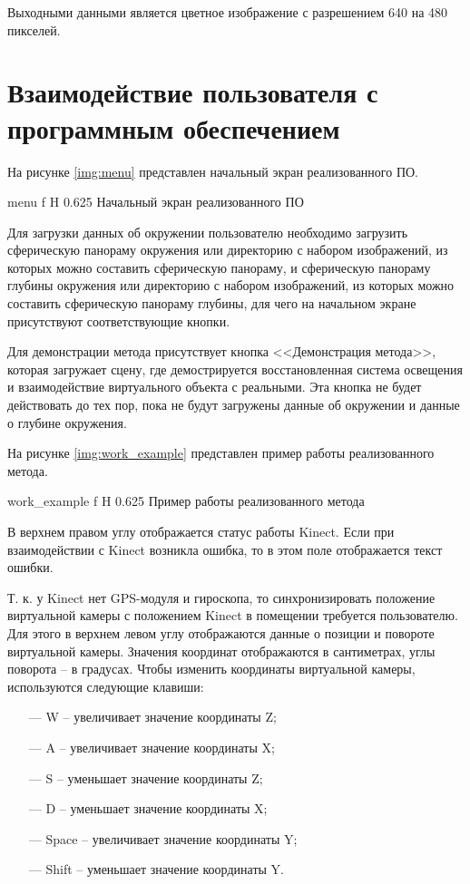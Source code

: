 Выходными данными является цветное изображение с разрешением 640 на 480 пикселей.

\section{Взаимодействие пользователя с программным обеспечением}

На рисунке \ref{img:menu} представлен начальный экран реализованного ПО.

{menu}
{f}
{H}
{0.625\textwidth}
{Начальный экран реализованного ПО}

Для загрузки данных об окружении пользователю необходимо загрузить сферическую панораму окружения или директорию с набором изображений, из которых можно составить сферическую панораму, и сферическую панораму глубины окружения или директорию с набором изображений, из которых можно составить сферическую панораму глубины, для чего на начальном экране присутствуют соответствующие кнопки.

Для демонстрации метода присутствует кнопка <<Демонстрация метода>>, которая загружает сцену, где демострируется восстановленная система освещения и взаимодействие виртуального объекта с реальными. Эта кнопка не будет действовать до тех пор, пока не будут загружены данные об окружении и данные о глубине окружения. 

На рисунке \ref{img:work_example} представлен пример работы реализованного метода.

{work_example}
{f}
{H}
{0.625\textwidth}
{Пример работы реализованного метода}

В верхнем правом углу отображается статус работы Kinect. Если при взаимодействии с Kinect возникла ошибка, то в этом поле отображается текст ошибки.

Т. к. у Kinect нет GPS-модуля и гироскопа, то синхронизировать положение виртуальной камеры с положением Kinect в помещении требуется пользователю. Для этого в верхнем левом углу отображаются данные о позиции и повороте виртуальной камеры. Значения координат отображаются в сантиметрах, углы поворота -- в градусах. Чтобы изменить координаты виртуальной камеры, используются следующие клавиши:

\begin{itemize}
	\item[---] W -- увеличивает значение координаты Z;
	\item[---] A -- увеличивает значение координаты X;
	\item[---] S -- уменьшает значение координаты Z;
	\item[---] D -- уменьшает значение координаты X;
	\item[---] Space -- увеличивает значение координаты Y;
	\item[---] Shift -- уменьшает значение координаты Y.
\end{itemize}

